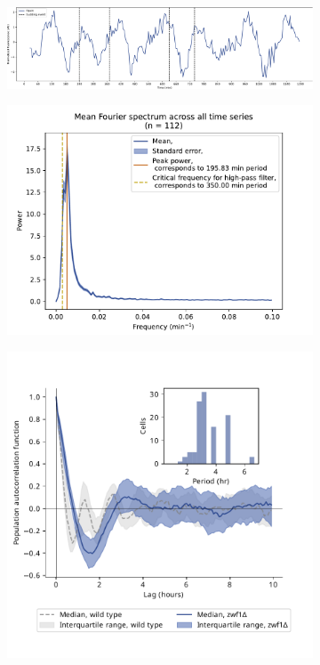 \begin{figure}
  \centering
  \begin{subfigure}[t]{1.0\textwidth}
   \centering
   \includegraphics[width=\textwidth]{409_zwf1egf_010-44-1_edit.pdf}
   \caption{
   }
   \label{fig:biology-zwf1-single}
  \end{subfigure}

  \begin{subfigure}[t]{0.45\textwidth}
   \centering
   \includegraphics[width=\textwidth]{zwf1egf_409_13.pdf}
   \caption{
   }
   \label{fig:biology-zwf1-fourier}
  \end{subfigure}%
  \begin{subfigure}[t]{0.45\textwidth}
   \centering
   \includegraphics[width=\textwidth]{zwf1egf_409_12.pdf}

\end{subfigure}
\end{figure}
